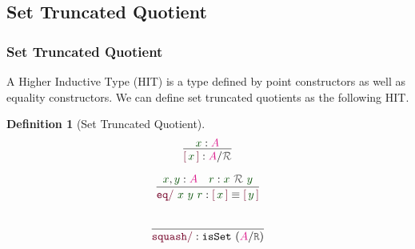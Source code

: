 \documentclass[xelatex,mathserif,serif,notheorems]{beamer} %
\theoremstyle{plain} %
\theoremstyle{definition}
\newtheorem{defn}[thm]{Definition}%
\theoremstyle{remark}
\newcommand*{\term}[1]{\textcolor{green!30!black}{#1}} %
\newcommand*{\type}[1]{\textcolor{magenta!90!black}{#1}}
\newcommand*{\relation}[1]{\textcolor{gray!75!black}{\ensuremath{\mathtt{#1}}}}
\newcommand*{\constructor}[1]{\textcolor{purple!60!black}{\ensuremath{\mathtt{#1}}}}
\newcommand*{\quotientconstructor}[1]{\constructor{[}\,#1\,\constructor{]}}
\newcommand{\setlengths}{
  \setlength{\abovedisplayskip}{4pt}
  \setlength{\belowdisplayskip}{4pt}
  \setlength{\abovedisplayshortskip}{2pt}
  \setlength{\belowdisplayshortskip}{2pt}
}
\newcommand{\startwitheq}{\vspace{-2.5mm}} %
\begin{document}
\subsection{Set Truncated Quotient}
\begin{frame}
  \frametitle{Set Truncated Quotient}
  A Higher Inductive Type (HIT) is a type defined by point constructors as well as equality constructors. \pause %
  \pause
  We can define set truncated quotients as the following HIT.
  \begin{defn}[Set Truncated Quotient]\setlengths \startwitheq
    \strut
    \hfill
    \begin{minipage}[b]{0.25\linewidth}
      \begin{equation}
        \vcenter{\infer{\quotientconstructor{\term{x}} : \type{A} / \relation{\mathcal{R}}}{\term{x} : \type{A}}}
      \end{equation}
    \end{minipage}
    \hfill
    \begin{minipage}[b]{0.4\linewidth}
      \begin{equation}
        \vcenter{\infer{\constructor{eq/}~\term{x}~\term{y}~\term{r} : \quotientconstructor{\term{x}} \equiv \quotientconstructor{\term{y}}}{\term{x}, \term{y} : \type{A} & \term{r} : \term{x}~\relation{\mathcal{R}}~\term{y}}}
      \end{equation}
    \end{minipage}
    \hfill
    \strut
    \begin{equation}
      \vcenter{\infer{\constructor{squash/} :\texttt{isSet}~(\type{A} / \relation{R})}{\strut}}
    \end{equation}
  \end{defn}
\end{frame}
\end{document}

